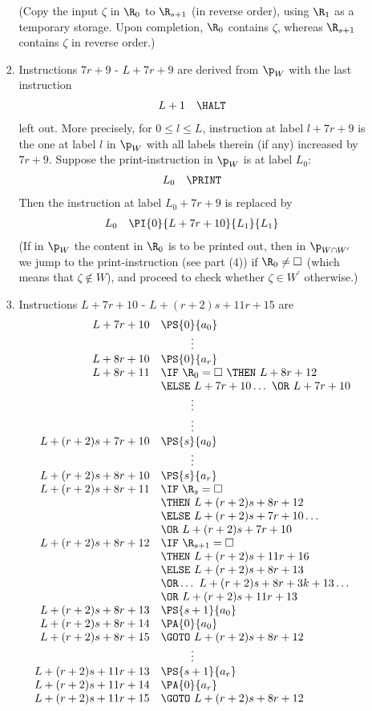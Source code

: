 \begin{enumerate}[1.]
\begin{enumerate}[(a)]
\begin{enumerate}[(1)]
\[\]
(Copy the input $\zeta$ in $\R_0$ to $\R_{s + 1}$ (in reverse order), using $\R_1$ as a temporary storage. Upon completion, $\R_0$ contains $\zeta$, whereas $\R_{s + 1}$ contains $\zeta$ in reverse order.)
\item Instructions $7r + 9$ - $L + 7r + 9$ are derived from $\p_W$ with the last instruction
\[
\begin{array}{rl}
L + 1 & \HALT
\end{array}
\]
left out. More precisely, for $0 \leq l \leq L$, instruction at label $l + 7r + 9$ is the one at label $l$ in $\p_W$ with all labels therein (if any) increased by $7r + 9$. Suppose the print-instruction in $\p_W$ is at label $L_0$:
\[
\begin{array}{rl}
L_0 & \PRINT
\end{array}
\]
Then the instruction at label $L_0 + 7r + 9$ is replaced by
\[
\begin{array}{rl}
L_0 & \PI{0}{L + 7r + 10}{L_1}{L_1}
\end{array}
\]
(If in $\p_W$ the content in $\R_0$ is to be printed out, then in $\p_{W \cap W^\prime}$ we jump to the print-instruction (see part (4)) if $\R_0 \neq \Box$ (which means that $\zeta \not\in W$), and proceed to check whether $\zeta \in W^\prime$ otherwise.)
\item Instructions $L + 7r + 10$ - $L + (r + 2)s + 11r + 15$ are
\[
\begin{array}{rl}
L + 7r + 10 & \PS{0}{a_0} \cr
\multicolumn{2}{c}{\vdots} \cr
L + 8r + 10 & \PS{0}{a_r} \cr
L + 8r + 11 & \IF \ \R_0 = \Box \ \THEN \ L + 8r + 12 \cr
\ & \ELSE \ L + 7r + 10 \ldots \ \OR \ L + 7r + 10 \cr
\multicolumn{2}{c}{\vdots} \cr
\multicolumn{2}{c}{\vdots} \cr
L + (r + 2)s + 7r + 10 & \PS{s}{a_0} \cr
\multicolumn{2}{c}{\vdots} \cr
L + (r + 2)s + 8r + 10 & \PS{s}{a_r} \cr
L + (r + 2)s + 8r + 11 & \IF \ \R_s = \Box \cr
\ & \THEN \ L + (r + 2)s + 8r + 12 \cr
\ & \ELSE \ L + (r + 2)s + 7r + 10 \ldots \cr
\ & \OR \ L + (r + 2)s + 7r + 10 \cr
L + (r + 2)s + 8r + 12 & \IF \ \R_{s + 1} = \Box \cr
\ & \THEN \ L + (r + 2)s + 11r + 16 \cr
\ & \ELSE \ L + (r + 2)s + 8r + 13 \cr
\ & \OR \ldots \ L + (r + 2)s + 8r + 3k + 13 \ldots \cr
\ & \OR \ L + (r + 2)s + 11r + 13 \cr
L + (r + 2)s + 8r + 13 & \PS{s + 1}{a_0} \cr
L + (r + 2)s + 8r + 14 & \PA{0}{a_0} \cr
L + (r + 2)s + 8r + 15 & \GOTO \ L + (r + 2)s + 8r + 12 \cr
\multicolumn{2}{c}{\vdots} \cr
L + (r + 2)s + 11r + 13 & \PS{s + 1}{a_r} \cr
L + (r + 2)s + 11r + 14 & \PA{0}{a_r} \cr
L + (r + 2)s + 11r + 15 & \GOTO \ L + (r + 2)s + 8r + 12
\end{array}
\]
\end{enumerate}
\end{enumerate}
\end{enumerate}
